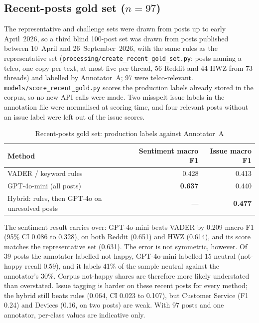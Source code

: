 \documentclass[11pt,a4paper]{article}
\begin{document}
\subsection{Recent-posts gold set ($n=97$)}
\label{sec:recentgold}

The representative and challenge sets were drawn from posts up to early April~2026, so a third blind 100-post set was drawn from posts published between 10~April and 26~September~2026, with the same rules as the representative set (\texttt{processing/create\_recent\_gold\_set.py}: posts naming a telco, one copy per text, at most five per thread, 56 Reddit and 44 HWZ from 73 threads) and labelled by Annotator~A; 97 were telco-relevant. \texttt{models/score\_recent\_gold.py} scores the production labels already stored in the corpus, so no new API calls were made. Two misspelt issue labels in the annotation file were normalised at scoring time, and four relevant posts without an issue label were left out of the issue scores.

\begin{table}[H]
\centering
\caption{Recent-posts gold set: production labels against Annotator~A}
\label{tab:recentgold}
\begin{tabular}{lrr}
\toprule
\textbf{Method} & \textbf{Sentiment macro F1} & \textbf{Issue macro F1} \\
\midrule
VADER / keyword rules & 0.428 & 0.413 \\
GPT-4o-mini (all posts) & \textbf{0.637} & 0.440 \\
Hybrid: rules, then GPT-4o on unresolved posts & --- & \textbf{0.477} \\
\bottomrule
\end{tabular}
\end{table}

The sentiment result carries over: GPT-4o-mini beats VADER by 0.209 macro F1 (95\% CI 0.086 to 0.328), on both Reddit (0.651) and HWZ (0.614), and its score matches the representative set (0.631). The error is not symmetric, however. Of 39 posts the annotator labelled not happy, GPT-4o-mini labelled 15 neutral (not-happy recall 0.59), and it labels 41\% of the sample neutral against the annotator's 30\%. Corpus not-happy shares are therefore more likely understated than overstated. Issue tagging is harder on these recent posts for every method; the hybrid still beats rules (0.064, CI 0.023 to 0.107), but Customer Service (F1 0.24) and Devices (0.16, on two posts) are weak. With 97 posts and one annotator, per-class values are indicative only.
\end{document}
